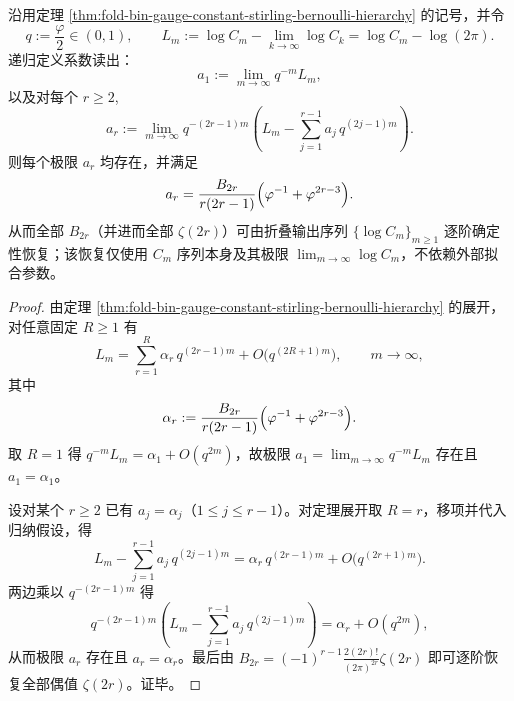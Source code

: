 \begin{proposition}\label{prop:fold-bin-gauge-bernoulli-extraction-operator}
沿用定理 \ref{thm:fold-bin-gauge-constant-stirling-bernoulli-hierarchy} 的记号，并令
\[
q:=\frac{\varphi}{2}\in(0,1),\qquad
L_m:=\log C_m-\lim_{k\to\infty}\log C_k=\log C_m-\log(2\pi).
\]
递归定义系数读出：
\[
a_1:=\lim_{m\to\infty}q^{-m}L_m,
\]
以及对每个 \(r\ge 2\),
\[
a_r:=\lim_{m\to\infty} q^{-(2r-1)m}\left(L_m-\sum_{j=1}^{r-1} a_j\,q^{(2j-1)m}\right).
\]
则每个极限 \(a_r\) 均存在，并满足
\[
a_r=\frac{B_{2r}}{r(2r-1)}\Bigl(\varphi^{-1}+\varphi^{2r-3}\Bigr).
\]
从而全部 \(B_{2r}\)（并进而全部 \(\zeta(2r)\)）可由折叠输出序列 \(\{\log C_m\}_{m\ge 1}\) 逐阶确定性恢复；该恢复仅使用 \(C_m\) 序列本身及其极限 \(\lim_{m\to\infty}\log C_m\)，不依赖外部拟合参数。
\end{proposition}
\begin{proof}
由定理 \ref{thm:fold-bin-gauge-constant-stirling-bernoulli-hierarchy} 的展开，对任意固定 \(R\ge 1\) 有
\[
L_m=\sum_{r=1}^{R}\alpha_r\,q^{(2r-1)m}+O\!\bigl(q^{(2R+1)m}\bigr),
\qquad m\to\infty,
\]
其中
\[
\alpha_r:=\frac{B_{2r}}{r(2r-1)}\Bigl(\varphi^{-1}+\varphi^{2r-3}\Bigr).
\]
取 \(R=1\) 得
\(
q^{-m}L_m=\alpha_1+O(q^{2m})
\)，故极限 \(a_1=\lim_{m\to\infty}q^{-m}L_m\) 存在且 \(a_1=\alpha_1\)。
\par
设对某个 \(r\ge 2\) 已有 \(a_j=\alpha_j\)（\(1\le j\le r-1\)）。对定理展开取 \(R=r\)，移项并代入归纳假设，得
\[
L_m-\sum_{j=1}^{r-1}a_j\,q^{(2j-1)m}
=\alpha_r\,q^{(2r-1)m}+O\!\bigl(q^{(2r+1)m}\bigr).
\]
两边乘以 \(q^{-(2r-1)m}\) 得
\[
q^{-(2r-1)m}\left(L_m-\sum_{j=1}^{r-1}a_j\,q^{(2j-1)m}\right)
=\alpha_r+O(q^{2m}),
\]
从而极限 \(a_r\) 存在且 \(a_r=\alpha_r\)。最后由
\(
B_{2r}=(-1)^{r-1}\frac{2(2r)!}{(2\pi)^{2r}}\zeta(2r)
\)
即可逐阶恢复全部偶值 \(\zeta(2r)\)。证毕。
\end{proof}

\endinput
